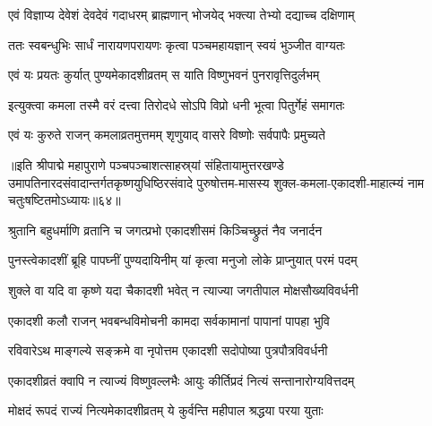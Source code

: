 \twolineshloka
{एवं विज्ञाप्य देवेशं देवदेवं गदाधरम्}
{ब्राह्मणान् भोजयेद् भक्त्या तेभ्यो दद्याच्च दक्षिणाम्}%

\twolineshloka
{ततः स्वबन्धुभिः सार्धं नारायणपरायणः}
{कृत्वा पञ्चमहायज्ञान् स्वयं भुञ्जीत वाग्यतः}%

\twolineshloka
{एवं यः प्रयतः कुर्यात् पुण्यमेकादशीव्रतम्}
{स याति विष्णुभवनं पुनरावृत्तिदुर्लभम्}%

\twolineshloka
{इत्युक्त्वा कमला तस्मै वरं दत्त्वा तिरोदधे}
{सोऽपि विप्रो धनी भूत्वा पितुर्गेहं समागतः}%


\twolineshloka
{एवं यः कुरुते राजन् कमलाव्रतमुत्तमम्}
{शृणुयाद् वासरे विष्णोः सर्वपापैः प्रमुच्यते}%

॥इति श्रीपाद्मे महापुराणे पञ्चपञ्चाशत्साहस्र्यां संहितायामुत्तरखण्डे उमापतिनारदसंवादान्तर्गतकृष्णयुधिष्ठिरसंवादे पुरुषोत्तम-मासस्य शुक्ल-कमला-एकादशी-माहात्म्यं नाम चतुःषष्टितमोऽध्यायः॥६४॥

\genMangalaShloka

\hyperref[sec:ekadashi_mahatmyam_padma_puranam]{\closesub}
\clearpage

\label{sec:padma-purushottama-krishna-parama}

\ganapatyadiDhyanam
\padmaPuranam



\twolineshloka
{श्रुतानि बहुधर्माणि व्रतानि च जगत्प्रभो}
{एकादशीसमं किञ्चिच्छ्रुतं नैव जनार्दन}%

\twolineshloka
{पुनस्त्वेकादशीं ब्रूहि पापघ्नीं पुण्यदायिनीम्}
{यां कृत्वा मनुजो लोके प्राप्नुयात् परमं पदम्}%


\twolineshloka
{शुक्ले वा यदि वा कृष्णे यदा चैकादशी भवेत्}
{न त्याज्या जगतीपाल मोक्षसौख्यविवर्धनी}%

\twolineshloka
{एकादशी कलौ राजन् भवबन्धविमोचनी}
{कामदा सर्वकामानां पापानां पापहा भुवि}%

\twolineshloka
{रविवारेऽथ माङ्गल्ये सङ्क्रमे वा नृपोत्तम}
{एकादशी सदोपोष्या पुत्रपौत्रविवर्धनी}%

\twolineshloka
{एकादशीव्रतं क्वापि न त्याज्यं विष्णुवल्लभैः}
{आयुः कीर्तिप्रदं नित्यं सन्तानारोग्यवित्तदम्}%

\twolineshloka
{मोक्षदं रूपदं राज्यं नित्यमेकादशीव्रतम्}
{ये कुर्वन्ति महीपाल श्रद्धया परया युताः}%

